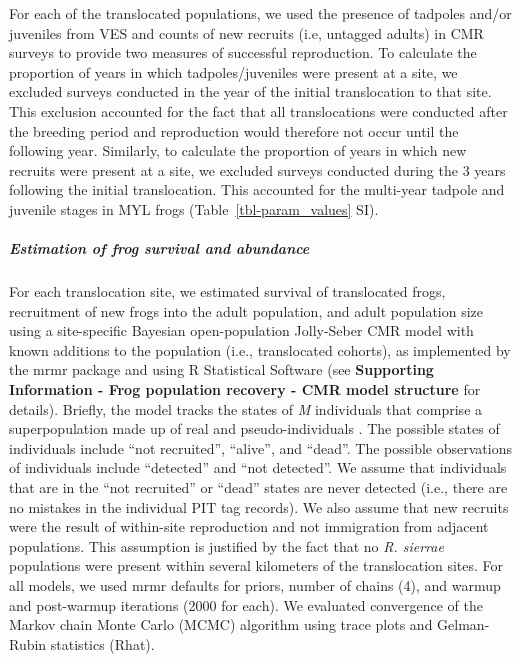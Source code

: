 \documentclass[
  letterpaper,
  DIV=11,
  numbers=noendperiod]{scrartcl}
\let\oldsubparagraph\subparagraph
\renewcommand{\subparagraph}[1]{\oldsubparagraph{#1}\mbox{}}
\begin{document}
For each of the translocated populations, we used the presence of
tadpoles and/or juveniles from VES and counts of new recruits (i.e,
untagged adults) in CMR surveys to provide two measures of successful
reproduction. To calculate the proportion of years in which
tadpoles/juveniles were present at a site, we excluded surveys conducted
in the year of the initial translocation to that site. This exclusion
accounted for the fact that all translocations were conducted after the
breeding period and reproduction would therefore not occur until the
following year. Similarly, to calculate the proportion of years in which
new recruits were present at a site, we excluded surveys conducted
during the 3 years following the initial translocation. This accounted
for the multi-year tadpole and juvenile stages in MYL frogs
(Table~\ref{tbl-param_values} SI).

\hypertarget{estimation-of-frog-survival-and-abundance}{%
\subparagraph{Estimation of frog survival and
abundance}\label{estimation-of-frog-survival-and-abundance}}

For each translocation site, we estimated survival of translocated
frogs, recruitment of new frogs into the adult population, and adult
population size using a site-specific Bayesian open-population
Jolly-Seber CMR model with known additions to the population (i.e.,
translocated cohorts), as implemented by the mrmr package
\citep{joseph2019} and using R Statistical Software
\citep[v4.4.4,][]{rsoftware2022} (see \textbf{Supporting Information -
Frog population recovery - CMR model structure} for details). Briefly,
the model tracks the states of \emph{M} individuals that comprise a
superpopulation made up of real and pseudo-individuals \citep[see][ for
details]{joseph2018}. The possible states of individuals include ``not
recruited'', ``alive'', and ``dead''. The possible observations of
individuals include ``detected'' and ``not detected''. We assume that
individuals that are in the ``not recruited'' or ``dead'' states are
never detected (i.e., there are no mistakes in the individual PIT tag
records). We also assume that new recruits were the result of
within-site reproduction and not immigration from adjacent populations.
This assumption is justified by the fact that no \emph{R. sierrae}
populations were present within several kilometers of the translocation
sites. For all models, we used mrmr defaults for priors, number of
chains (4), and warmup and post-warmup iterations (2000 for each). We
evaluated convergence of the Markov chain Monte Carlo (MCMC) algorithm
using trace plots and Gelman-Rubin statistics (Rhat).
\end{document}
